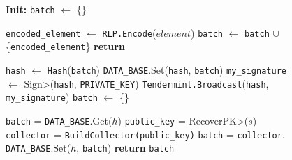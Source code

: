 \begin{figure}[t!]
  \begin{adjustbox}{minipage=[t]{\columnwidth}}
    \begin{algorithm}[H]
      \renewcommand{\thealgorithm}{Hash Collector}         
      \caption{}%
      \label{alg:collector-hash}%
      \small
      \begin{algorithmic}[1]
            \State \textbf{Init:} \texttt{batch} $\leftarrow$ \{\}
      
            \label{alg:hash_add_tx}
            			\State \texttt{encoded\_element} $\leftarrow$ \texttt{RLP.Encode}($element$)
					        \State \texttt{batch} $\leftarrow$ \texttt{batch} $\cup$ \{\texttt{encoded\_element}\}
                \EndIf
                \State \textbf{return}
            \EndFunction

            \smallskip

              \State \texttt{hash} $\leftarrow$  \texttt{Hash}(\texttt{batch})
              \State \texttt{DATA\_BASE}.Set(\texttt{hash}, \texttt{batch})
              \State \texttt{my\_signature} $\leftarrow$ \<Sign>(\texttt{hash}, \texttt{PRIVATE\_KEY})
              \State \texttt{Tendermint.Broadcast}(\texttt{hash}, \texttt{my\_signature})
              \State \texttt{batch} $\leftarrow$ \{\}
            \EndWhen

            \label{alg:hash_request_tx}
                \State \texttt{batch} = \texttt{DATA\_BASE}.Get($h$)
              \Else
                \State \texttt{public\_key} = \<RecoverPK>($s$)
                \State \texttt{collector} = \texttt{BuildCollector(public\_key)}
                \State \texttt{batch} = \texttt{collector}.
                \State \texttt{DATA\_BASE}.Set($h$, \texttt{batch})
              \EndIf
              \State \textbf{return} \texttt{batch}
            \EndFunction
            
        \end{algorithmic}
      \end{algorithm}
	\end{adjustbox}
  \end{figure}
